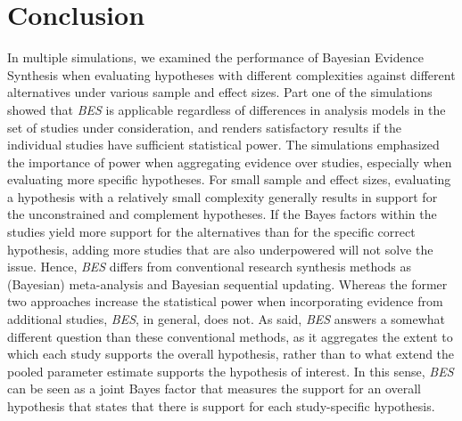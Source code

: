 \documentclass[
]{interact}
\begin{document}
                    \hypertarget{conclusion}{%
                      \section{Conclusion}\label{conclusion}}
                    
                    In multiple simulations, we examined the performance of Bayesian
                    Evidence Synthesis when evaluating hypotheses with different
                    complexities against different alternatives under various sample and
                    effect sizes. Part one of the simulations showed that \emph{BES} is
                    applicable regardless of differences in analysis models in the set of
                    studies under consideration, and renders satisfactory results if the
                    individual studies have sufficient statistical power. The simulations
                    emphasized the importance of power when aggregating evidence over
                    studies, especially when evaluating more specific hypotheses. For small
                    sample and effect sizes, evaluating a hypothesis with a relatively small
                    complexity generally results in support for the unconstrained and
                    complement hypotheses. If the Bayes factors within the studies yield
                    more support for the alternatives than for the specific correct
                    hypothesis, adding more studies that are also underpowered will not
                    solve the issue. Hence, \emph{BES} differs from conventional research
                    synthesis methods as (Bayesian) meta-analysis and Bayesian sequential
                    updating. Whereas the former two approaches increase the statistical
                    power when incorporating evidence from additional studies, \emph{BES},
                    in general, does not. As said, \emph{BES} answers a somewhat different
                    question than these conventional methods, as it aggregates the extent to
                    which each study supports the overall hypothesis, rather than to what
                    extend the pooled parameter estimate supports the hypothesis of
                    interest. In this sense, \emph{BES} can be seen as a joint Bayes factor
                    that measures the support for an overall hypothesis that states that
                    there is support for each study-specific hypothesis.
                    
\end{document}

